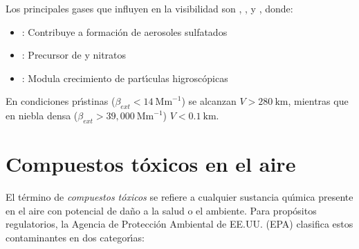 Los principales gases que influyen en la visibilidad son , , y , donde:
\begin{itemize}
    \item {}: Contribuye a formaci\'on de aerosoles sulfatados
    \item {}: Precursor de  y nitratos
    \item {}: Modula crecimiento de part\'{\i}culas higrosc\'opicas
\end{itemize}

En condiciones pr\'{\i}stinas ($\beta_{ext} < 14\ \text{Mm}^{-1}$) se alcanzan $V > \SI{280}{\kilo\metre}$, mientras que en niebla densa ($\beta_{ext} > 39,000\ \text{Mm}^{-1}$) $V < \SI{0.1}{\kilo\metre}$.

\section{Compuestos t\'oxicos en el aire}
\label{ctox}
\normalsize
El t\'ermino de \emph{compuestos t\'oxicos} se refiere a cualquier sustancia qu\'{\i}mica presente en el aire con potencial de da\~no a la salud o el ambiente. Para prop\'ositos regulatorios, la Agencia de Protecci\'on Ambiental de EE.UU. (EPA) clasifica estos contaminantes en dos categor\'{\i}as:

